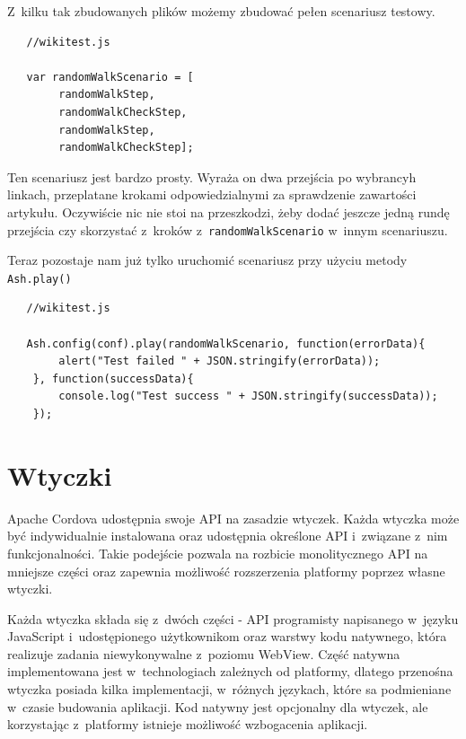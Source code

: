 \documentclass[brudnopis]{xmgr}
\begin{document}
Z~kilku tak zbudowanych plików możemy zbudować pełen scenariusz testowy.

\begin{lstlisting}
   //wikitest.js

   var randomWalkScenario = [
        randomWalkStep,
        randomWalkCheckStep,
        randomWalkStep,
        randomWalkCheckStep];

\end{lstlisting}

Ten scenariusz jest bardzo prosty. Wyraża on dwa przejścia po wybrancyh linkach, przeplatane krokami odpowiedzialnymi za sprawdzenie zawartości artykułu. Oczywiście nic nie stoi na przeszkodzi, żeby dodać jeszcze jedną rundę przejścia czy skorzystać z~kroków z~\texttt{randomWalkScenario} w~innym scenariuszu.

Teraz pozostaje nam już tylko uruchomić scenariusz przy użyciu metody \texttt{Ash.play()}

\begin{lstlisting}
   //wikitest.js

   Ash.config(conf).play(randomWalkScenario, function(errorData){
        alert("Test failed " + JSON.stringify(errorData));
    }, function(successData){
        console.log("Test success " + JSON.stringify(successData));
    });

\end{lstlisting}

\chapter{Wtyczki}

Apache Cordova udostępnia swoje API na zasadzie wtyczek. Każda wtyczka może być indywidualnie instalowana oraz udostępnia określone API i~związane z~nim funkcjonalności. Takie podejście pozwala na rozbicie monolitycznego API na mniejsze części oraz zapewnia możliwość rozszerzenia platformy poprzez własne wtyczki.

Każda wtyczka składa się z~dwóch części - API programisty napisanego w~języku JavaScript i~udostępionego użytkownikom oraz warstwy kodu natywnego, która realizuje zadania niewykonywalne z~poziomu WebView. Część natywna implementowana jest w~technologiach zależnych od platformy, dlatego przenośna wtyczka posiada kilka implementacji, w~różnych językach, które sa podmieniane w~czasie budowania aplikacji. Kod natywny jest opcjonalny dla wtyczek, ale korzystając z~platformy istnieje możliwość wzbogacenia aplikacji.
\end{document}
